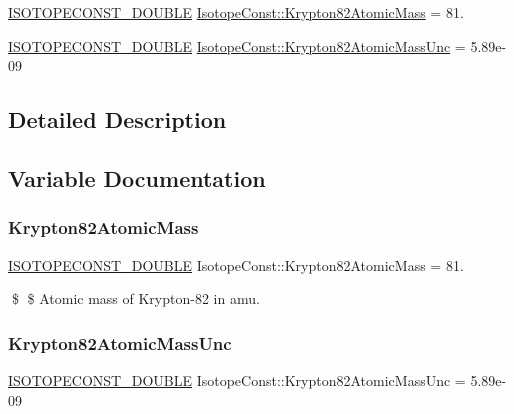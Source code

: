 \begin{DoxyCompactItemize}
\item 
\mbox{\hyperlink{group___isotope_const-_macros_ga8f45a7272ce02c0b4c65c44636ed719a}{I\+S\+O\+T\+O\+P\+E\+C\+O\+N\+S\+T\+\_\+\+D\+O\+U\+B\+LE}} \mbox{\hyperlink{group___isotope_const-_krypton-_kr82_ga1ed07878d653330718e8e3c70de51bec}{Isotope\+Const\+::\+Krypton82\+Atomic\+Mass}} = 81.
\item 
\mbox{\hyperlink{group___isotope_const-_macros_ga8f45a7272ce02c0b4c65c44636ed719a}{I\+S\+O\+T\+O\+P\+E\+C\+O\+N\+S\+T\+\_\+\+D\+O\+U\+B\+LE}} \mbox{\hyperlink{group___isotope_const-_krypton-_kr82_gaad30b13c3f3b4fafbf8ee99595ed18f0}{Isotope\+Const\+::\+Krypton82\+Atomic\+Mass\+Unc}} = 5.\+89e-\/09
\end{DoxyCompactItemize}


\subsection{Detailed Description}


\subsection{Variable Documentation}
\mbox{\label{group___isotope_const-_krypton-_kr82_ga1ed07878d653330718e8e3c70de51bec}} 
\subsubsection{\texorpdfstring{Krypton82\+Atomic\+Mass}{Krypton82AtomicMass}}
{\footnotesize\ttfamily \mbox{\hyperlink{group___isotope_const-_macros_ga8f45a7272ce02c0b4c65c44636ed719a}{I\+S\+O\+T\+O\+P\+E\+C\+O\+N\+S\+T\+\_\+\+D\+O\+U\+B\+LE}} Isotope\+Const\+::\+Krypton82\+Atomic\+Mass = 81.}

\$ \$ Atomic mass of Krypton-\/82 in amu. \mbox{\label{group___isotope_const-_krypton-_kr82_gaad30b13c3f3b4fafbf8ee99595ed18f0}} 
\subsubsection{\texorpdfstring{Krypton82\+Atomic\+Mass\+Unc}{Krypton82AtomicMassUnc}}
{\footnotesize\ttfamily \mbox{\hyperlink{group___isotope_const-_macros_ga8f45a7272ce02c0b4c65c44636ed719a}{I\+S\+O\+T\+O\+P\+E\+C\+O\+N\+S\+T\+\_\+\+D\+O\+U\+B\+LE}} Isotope\+Const\+::\+Krypton82\+Atomic\+Mass\+Unc = 5.\+89e-\/09}

